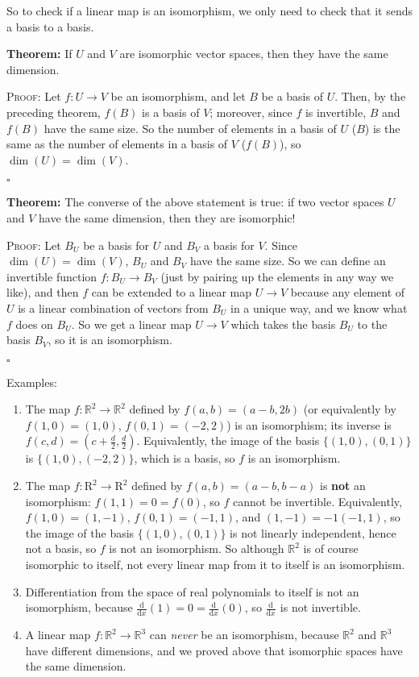 \documentclass{article}
\newcommand{\qed}{{}\par\hfill$\square$\bigskip}
\newcommand{\deriv}[3][]{\frac{\mathrm{d}^{#1}#2}{\mathrm{d}#3^{#1}}}
\begin{document}
So to check if a linear map is an isomorphism, we only need to check that it sends a basis to a basis.\medskip

\textbf{Theorem:}
If $U$ and $V$ are isomorphic vector spaces, then they have the same dimension.\medskip

\textsc{Proof:}
Let $f:U\to V$ be an isomorphism, and let $B$ be a basis of $U$. Then, by the preceding theorem, $f(B)$ is a basis of $V$; moreover, since $f$ is invertible, $B$ and $f(B)$ have the same size. So the number of elements in a basis of $U$ ($B$) is the same as the number of elements in a basis of $V$ ($f(B)$), so $\dim(U)=\dim(V)$.\qed

\textbf{Theorem:}
The converse of the above statement is true: if two vector spaces $U$ and $V$ have the same dimension, then they are isomorphic!\medskip

\textsc{Proof:}
Let $B_U$ be a basis for $U$ and $B_V$ a basis for $V$. Since $\dim(U)=\dim(V)$, $B_U$ and $B_V$ have the same size. So we can define an invertible function $f:B_U\to B_V$ (just by pairing up the elements in any way we like), and then $f$ can be extended to a linear map $U\to V$ because any element of $U$ is a linear combination of vectors from $B_U$ in a unique way, and we know what $f$ does on $B_U$. So we get a linear map $U\to V$ which takes the basis $B_U$ to the basis $B_V$, so it is an isomorphism.\qed


Examples:

\begin{enumerate}
	\item The map $f:\mathbb{R}^2\to\mathbb{R}^2$ defined by $f(a,b)=(a-b,2b)$ (or equivalently by $f(1,0)=(1,0)$, $f(0,1)=(-2,2)$) is an isomorphism; its inverse is $f(c,d)=\left(c+\frac{d}{2},\frac{d}{2}\right)$. Equivalently, the image of the basis $\{(1,0),(0,1)\}$ is $\{(1,0),(-2,2)\}$, which is a basis, so $f$ is an isomorphism.
	\item The map $f:\mathrm{R}^2\to\mathrm{R}^2$ defined by $f(a,b)=(a-b,b-a)$ is \textbf{not} an isomorphism: $f(1,1)=0=f(0)$, so $f$ cannot be invertible. Equivalently, $f(1,0)=(1,-1)$, $f(0,1)=(-1,1)$, and $(1,-1)=-1(-1,1)$, so the image of the basis $\{(1,0),(0,1)\}$ is not linearly independent, hence not a basis, so $f$ is not an isomorphism. So although $\mathbb{R}^2$ is of course isomorphic to itself, not every linear map from it to itself is an isomorphism.
	\item Differentiation from the space of real polynomials to itself is not an isomorphism, because $\deriv{}{x}(1)=0=\deriv{}{x}(0)$, so $\deriv{}{x}$ is not invertible.
	\item A linear map $f:\mathbb{R}^2\to\mathbb{R}^3$ can \textit{never} be an isomorphism, because $\mathbb{R}^2$ and $\mathbb{R}^3$ have different dimensions, and we proved above that isomorphic spaces have the same dimension.
\end{enumerate}
\end{document}
